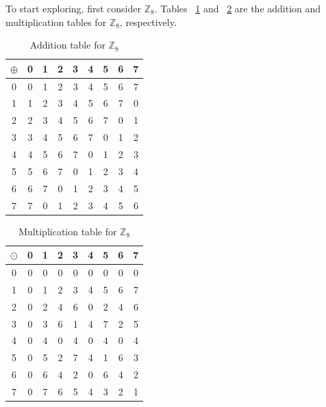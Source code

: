 \begin{example}{} 
To start exploring, first consider ${\mathbb Z}_8$. Tables ~\ref{groups_Z8_add_table} and ~\ref{groups_Z8_mult_table} are the addition and multiplication tables for ${\mathbb Z}_8$, respectively.

\begin{table}[h]
\caption{\label{groups_Z8_add_table}Addition table for ${\mathbb Z}_8$}{\small
\begin{center}
\begin{tabular}{c|cccccccc}
$\oplus$ & 0 & 1 & 2 & 3 & 4 & 5 & 6 & 7 \\
\hline
0        & 0 & 1 & 2 & 3 & 4 & 5 & 6 & 7 \\
1       & 1 & 2 & 3 & 4 & 5 & 6 & 7 & 0 \\
2       & 2 & 3 & 4 & 5 & 6 & 7 & 0 & 1\\
3       & 3 & 4 & 5 & 6 & 7 & 0 & 1 & 2\\
4       & 4 & 5 & 6 & 7 & 0 & 1 & 2 & 3\\
5       & 5 & 6 & 7 & 0 & 1 & 2 & 3 & 4\\
6       & 6 & 7 & 0 & 1 & 2 & 3 & 4 & 5\\
7       & 7 & 0 & 1 & 2 & 3 & 4 & 5 & 6\\
\end{tabular}
\end{center}
}
\end{table}

\begin{table}[h]
\caption{\label{groups_Z8_mult_table} Multiplication table for ${\mathbb Z}_8$}
{ \small
\begin{center}
\begin{tabular}{c|cccccccc}
$\odot$ & 0 & 1 & 2 & 3 & 4 & 5 & 6 & 7 \\
\hline
0       & 0 & 0 & 0 & 0 & 0 & 0 & 0 & 0 \\
1       & 0 & 1 & 2 & 3 & 4 & 5 & 6 & 7 \\
2       & 0 & 2 & 4 & 6 & 0 & 2 & 4 & 6 \\
3       & 0 & 3 & 6 & 1 & 4 & 7 & 2 & 5 \\
4       & 0 & 4 & 0 & 4 & 0 & 4 & 0 & 4 \\
5       & 0 & 5 & 2 & 7 & 4 & 1 & 6 & 3 \\
6       & 0 & 6 & 4 & 2 & 0 & 6 & 4 & 2 \\
7       & 0 & 7 & 6 & 5 & 4 & 3 & 2 & 1
\end{tabular}
\end{center}
}
\end{table}
\end{example}

